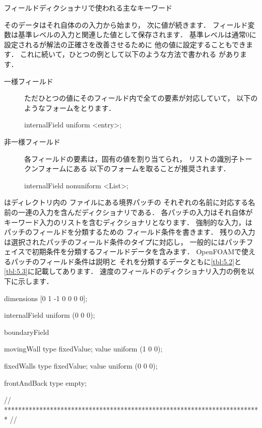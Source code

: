 \begin{table}[ht]
 
 \caption{フィールドディクショナリで使われる主なキーワード}
 \label{tbl:4.3}
\end{table}


そのデータはそれ自体のの入力から始まり，
次に値が続きます．
フィールド変数は基準レベルの入力と関連した値として保存されます．
基準レベルは通常$0$に設定されるが解法の正確さを改善させるために
他の値に設定することもできます．
これに続いて，ひとつの例として以下のような方法で書かれる
があります．
\begin{description}
 \item[一様フィールド]
            ただひとつの値にそのフィールド内で全ての要素が対応していて，
            以下のようなフォームをとります．
\begin{OFverbatim}[file]
internalField uniform <entry>;
\end{OFverbatim}
 \item[非一様フィールド]
            各フィールドの要素は，固有の値を割り当てられ，
            リストの識別子トークンフォームにある
            以下のフォームを取ることが推奨されます．
\begin{OFverbatim}[file]
internalField nonuniform <List>;
\end{OFverbatim}
\end{description}
はディレクトリ内の
ファイルにある境界パッチの
それぞれの名前に対応する名前の一連の入力を含んだディクショナリである．
各パッチの入力はそれ自体がキーワード入力のリストを含むディクショナリとなります．
強制的な入力，はパッチのフィールドを分類するための
フィールド条件を書きます．
残りの入力は選択されたパッチのフィールド条件のタイプに対応し，
一般的にはパッチフェイスで初期条件を分類するフィールドデータを含みます．
OpenFOAMで使えるパッチのフィールド条件は説明と
それを分類するデータともに\autoref{tbl:5.2}と
\autoref{tbl:5.3}に記載してあります．
速度のフィールドのディクショナリ入力の例を以下に示します．
\begin{OFverbatim}[file, linenum=17]
dimensions      [0 1 -1 0 0 0 0];

internalField   uniform (0 0 0);

boundaryField
{
    movingWall
    {
        type            fixedValue;
        value           uniform (1 0 0);
    }

    fixedWalls
    {
        type            fixedValue;
        value           uniform (0 0 0);
    }

    frontAndBack
    {
        type            empty;
    }
}

// ************************************************************************* //
\end{OFverbatim}



